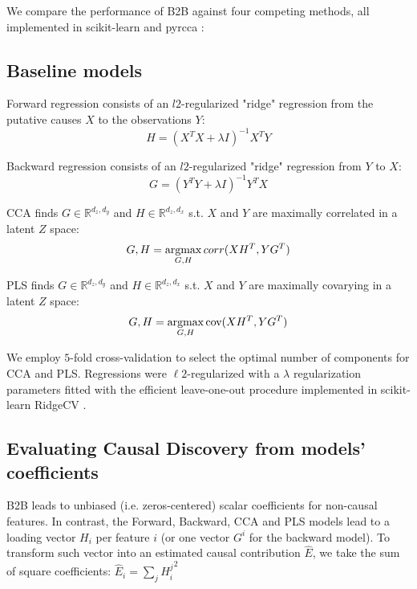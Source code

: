 We compare the performance of B2B against four competing methods, all
implemented in scikit-learn \citep{sklearn} and pyrcca \citep{bilenko2016pyrcca}:
%

\subsection{Baseline models}

Forward regression consists of an $l2$-regularized "ridge" regression from the
putative causes $X$ to the observations $Y$: \begin{equation} H = (X^T X
+\lambda I)^{-1} X^T Y \end{equation}

Backward regression consists of an $l2$-regularized "ridge" regression from $Y$
to $X$: \begin{equation} G = (Y^T Y +\lambda I)^{-1} Y^T X \end{equation}

CCA finds $G\in\mathbb{R}^{d_z, d_y}$ and $H\in\mathbb{R}^{d_z, d_x}$
s.t.
$X$ and $Y$ are maximally correlated in a latent $Z$ space:
\begin{equation} G,H = \operatorname*{argmax}_{G,H} corr(XH^T, YG^T) \end{equation}

PLS finds $G\in\mathbb{R}^{d_z, d_y}$ and $H\in\mathbb{R}^{d_z, d_x}$
s.t.
$X$ and $Y$ are maximally covarying in a latent $Z$ space:
\begin{equation} G,H = \operatorname*{argmax}_{G,H} \text{cov}(XH^T, YG^T) \end{equation}

We employ $5$-fold cross-validation to select the optimal number of components
for CCA and PLS. Regressions were $\ell2$-regularized with a $\lambda$ regularization
parameters fitted with the efficient leave-one-out procedure implemented in
scikit-learn RidgeCV \citep{sklearn}.

\subsection{Evaluating Causal Discovery from models' coefficients}

B2B leads to unbiased (i.e. zeros-centered) scalar coefficients for non-causal
features. In contrast, the Forward, Backward, CCA and PLS models lead to a
loading vector $H_i$ per feature $i$ (or one vector $G^i$ for the backward
model). To transform such vector into an estimated causal contribution $\hat E$,
we take the sum of square coefficients:
  $\hat E_i = \sum_j {H^j_i}^2 $

